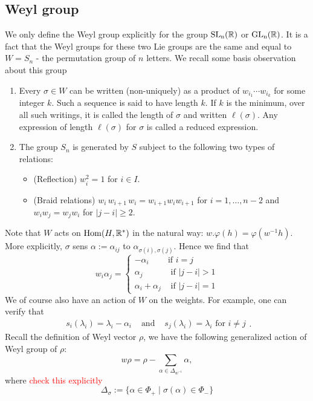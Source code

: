 \subsection{Weyl group}
We only define the Weyl group explicitly for the group $\operatorname{\text{SL}_n(\mathbb{R})}$ or $\operatorname{\text{GL}_n(\mathbb{R})}$. It is a fact that the Weyl groups for
these two Lie groups are the same and equal to $W = S_n$ - the permutation group of $n$ letters.  We recall some basis
observation about this group
\begin{enumerate}
    \item Every $\sigma \in W$ can be written (non-uniquely) as a product of $w_{i_1} \cdots w_{i_k}$ for some integer $k$. Such a sequence is said to have length $k.$ If $k$ is the minimum, over all such writings, it is called the length of $\sigma$ and written $\ell(\sigma)$. Any expression of length $\ell(\sigma)$ for $\sigma$ is called a reduced expression.

    \item The group $S_n$ is generated by $S$ subject to the following two types of relations:
          \begin{itemize}
              \item (Reflection) $w_i^2=1$ for $i \in I$.
              \item (Braid relations) $w_i \, w_{i+1} \, w_i = w_{i+1}w_i w_{i+1}$ for $i = 1, \ldots, n-2$ and $w_i w_j = w_j w_i$ for $|j -i |\geq 2$.
          \end{itemize}
\end{enumerate}
Note that $W$ acts on $\operatorname{Hom}(H, \mathbb{R}^*)$ in the natural way: $w . \varphi(h) = \varphi(w^{-1} h)$. More explicitly,  $\sigma$ sens $\alpha:= \alpha_{ij}$ to $\alpha_{\sigma(i), \sigma(j)}$. Hence we find that
\[w_i \alpha_j = \begin{cases} - \alpha_i          & \mbox{if } i=j           \\
              \alpha_j            & \mbox{ if } |j - i | > 1 \\
              \alpha_i + \alpha_j & \mbox{ if } |j-i|=1\end{cases} \]
We of course also have an action of $W$ on the weights.  For example, one can verify that
\[ \begin{array}{lcr} s_i(\lambda_i) = \lambda_i - \alpha_i & \text{ and } & s_j(\lambda_i) = \lambda_i \mbox{ for } i \neq j \end{array}.\]
Recall the definition of Weyl vector $\rho$, we have the following generalized action of Weyl group of $\rho$:
\[ w \rho = \rho - \sum_{\alpha \in \Delta_{w^{-1}}} \alpha,\]
where \textcolor{red}{check this explicitly}
\[\Delta_{\sigma}:= \{ \alpha \in \Phi_+ \mid \sigma(\alpha) \in \Phi_- \}\]
